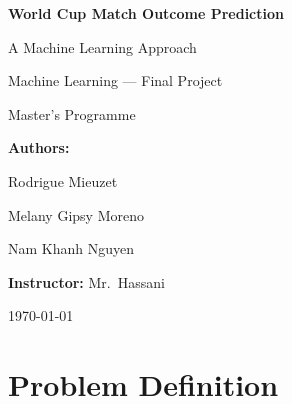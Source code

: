 \documentclass[12pt,a4paper,openany]{report}
\begin{document}
\begin{titlepage}
    \centering

    {\Large\bfseries World Cup Match Outcome Prediction\par}
    \vspace{0.3cm}
    {\large A Machine Learning Approach\par}

    \vspace{1.2cm}


    {\Large Machine Learning --- Final Project\par}
    \vspace{0.2cm}
    {\large Master's Programme\par}

    \vspace{1.2cm}

    {\large \textbf{Authors:}\par}
    \vspace{0.3cm}
    {\large Rodrigue Mieuzet\par}
    {\large Melany Gipsy Moreno\par}
    {\large Nam Khanh Nguyen\par}

    \vspace{1.2cm}

    {\large \textbf{Instructor:} Mr.\ Hassani\par}

    \vfill

    {\large \today\par}
\end{titlepage}

\tableofcontents
\newpage

\chapter{Problem Definition}
\end{document}
